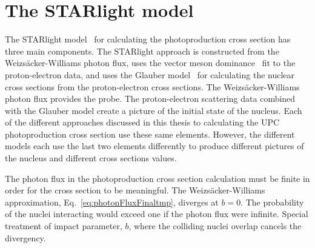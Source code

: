   \section{\label{sec:vdmTheory}The STARlight model}
    The STARlight model~\cite{vmd1999,starlight} for calculating the \JPsi{}
      photoproduction cross section has three main components.
    The STARlight approach is constructed from the Weizs\"{a}cker-Williams 
    photon flux, uses the vector meson dominance~\cite{Bauer:1977iq} fit to the proton-electron data, 
      and uses the Glauber model~\cite{Miller:2007ri} for calculating the nuclear cross sections from 
      the proton-electron cross sections.
    The Weizs\"{a}cker-Williams photon flux provides the probe. 
    The proton-electron scattering data combined with the Glauber model  
      create a picture of the initial state of the nucleus. 
    Each of the different approaches discussed in this thesis to calculating 
      the UPC \JPsi{}  photoproduction cross section use these same elements.
    However, the different models each use the last two elements differently 
      to produce different pictures of the nucleus and different cross 
      sections values. 

    The photon flux in the photoproduction cross section calculation must be 
      finite in order for the cross section to be meaningful.
    The Weizs\"{a}cker-Williams approximation, Eq.~\ref{eq:photonFluxFinaltmp}, 
      diverges at $b=0$.
    The probability of the nuclei interacting would exceed one if the photon 
      flux were infinite. 
    Special treatment of impact parameter, $b$, where the colliding nuclei 
      overlap cancels the divergency. 
    
